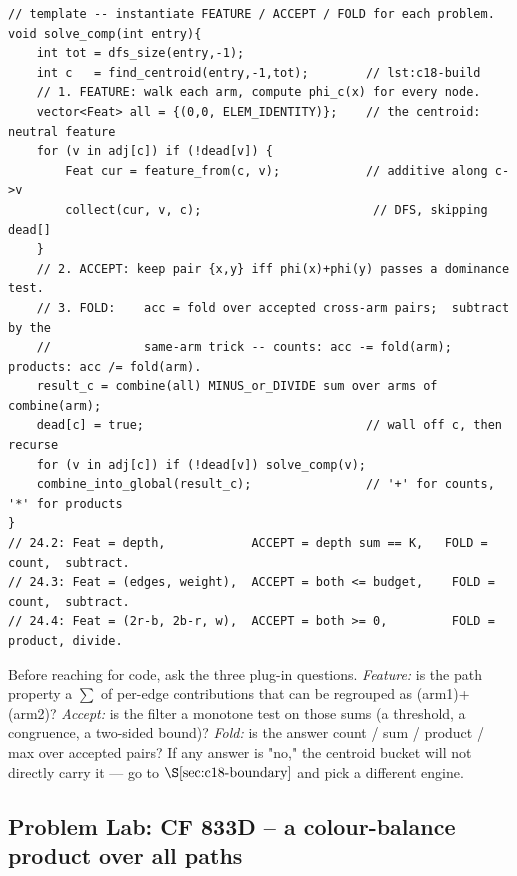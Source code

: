 \begin{lstlisting}[caption={The reusable centroid divide-and-conquer skeleton with its three plug-ins named. Feature (additive per node), accept (2-D dominance), and the accumulator fold are the only things that change between 24.2, 24.3 and 24.4. ASCII only}, label={lst:c18-beyond}]
// template -- instantiate FEATURE / ACCEPT / FOLD for each problem.
void solve_comp(int entry){
    int tot = dfs_size(entry,-1);
    int c   = find_centroid(entry,-1,tot);        // lst:c18-build
    // 1. FEATURE: walk each arm, compute phi_c(x) for every node.
    vector<Feat> all = {(0,0, ELEM_IDENTITY)};    // the centroid: neutral feature
    for (v in adj[c]) if (!dead[v]) {
        Feat cur = feature_from(c, v);            // additive along c->v
        collect(cur, v, c);                        // DFS, skipping dead[]
    }
    // 2. ACCEPT: keep pair {x,y} iff phi(x)+phi(y) passes a dominance test.
    // 3. FOLD:    acc = fold over accepted cross-arm pairs;  subtract by the
    //             same-arm trick -- counts: acc -= fold(arm);  products: acc /= fold(arm).
    result_c = combine(all) MINUS_or_DIVIDE sum over arms of combine(arm);
    dead[c] = true;                               // wall off c, then recurse
    for (v in adj[c]) if (!dead[v]) solve_comp(v);
    combine_into_global(result_c);                // '+' for counts, '*' for products
}
// 24.2: Feat = depth,            ACCEPT = depth sum == K,   FOLD = count,  subtract.
// 24.3: Feat = (edges, weight),  ACCEPT = both <= budget,    FOLD = count,  subtract.
// 24.4: Feat = (2r-b, 2b-r, w),  ACCEPT = both >= 0,         FOLD = product, divide.
\end{lstlisting}

\begin{observation}
Before reaching for code, ask the three plug-in questions. \emph{Feature:} is the path
property a \(\sum\) of per-edge contributions that can be regrouped as (arm1)+(arm2)?
\emph{Accept:} is the filter a monotone test on those sums (a threshold, a congruence, a
two-sided bound)? \emph{Fold:} is the answer count / sum / product / max over accepted
pairs? If any answer is "no," the centroid bucket will not directly carry it --- go to
\(\secref{c18-boundary}\) and pick a different engine.
\end{observation}

\subsection{Problem Lab: CF 833D -- a colour-balance product over all paths}

